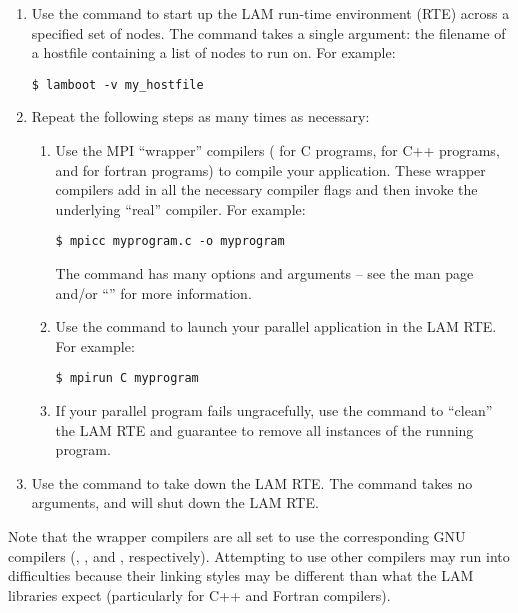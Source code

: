 \begin{enumerate}
\item Use the  command to start up the LAM run-time
  environment (RTE) across a specified set of nodes.  The
   command takes a single argument: the filename of a
  hostfile containing a list of nodes to run on.  For example:

\begin{verbatim}
$ lamboot -v my_hostfile
\end{verbatim}

\item Repeat the following steps as many times as necessary:

  \begin{enumerate}
  \item Use the MPI ``wrapper'' compilers ( for C programs,
     for C++ programs, and  for fortran
    programs) to compile your application.  These wrapper compilers
    add in all the necessary compiler flags and then invoke the
    underlying ``real'' compiler.  For example:
    
\begin{verbatim}
$ mpicc myprogram.c -o myprogram
\end{verbatim}
    
    The  command has many options and arguments -- see the
    man page and/or ``'' for more information.

  \item Use the  command to launch your parallel
    application in the LAM RTE.  For example:

\begin{verbatim}
$ mpirun C myprogram
\end{verbatim}
    
  \item If your parallel program fails ungracefully, use the
     command to ``clean'' the LAM RTE and guarantee to
    remove all instances of the running program.

  \end{enumerate}

\item Use the  command to take down the LAM RTE.  The
   command takes no arguments, and will shut down the LAM
  RTE.
\end{enumerate}

Note that the wrapper compilers are all set to use the corresponding
GNU compilers (, , and , respectively).
Attempting to use other compilers may run into difficulties because
their linking styles may be different than what the LAM libraries
expect (particularly for C++ and Fortran compilers).

